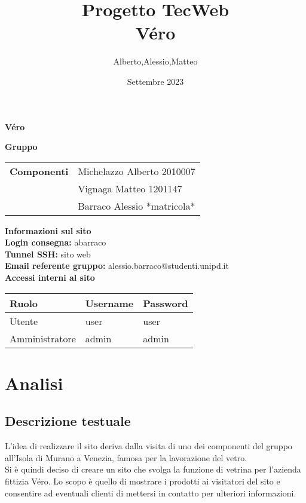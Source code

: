 \documentclass[a4paper, 11pt]{article}
\title{Progetto TecWeb \\ Véro}
\author{Alberto,Alessio,Matteo}
\date{Settembre 2023}
\begin{document}
\begin{center}
	\textbf{\Huge{Véro}}
\end{center}

\vspace{5pt}

\begin{center}
	\textbf{\Large{Gruppo}}
    \begin{table}[H]
        \hspace{3.5cm}
        \renewcommand{\arraystretch}{1.4}
        \begin{tabular}{l | l}
            \textbf{Componenti} & Michelazzo Alberto 2010007\\
            & Vignaga Matteo 1201147\\
            & Barraco Alessio *matricola*\\
        \end{tabular}
    \end{table}
\end{center}


\begin{center}
	\textbf{\Large{Informazioni sul sito}}\\
	\vspace{4pt}
	\textbf{Login consegna:} abarraco \\
	\textbf{Tunnel SSH:} sito web\\
	\textbf{Email referente gruppo:} alessio.barraco@studenti.unipd.it\\
    \vspace{1cm}
    \textbf{Accessi interni al sito}
    \begin{longtable}{|l|l|l|}
        \hline
        {Ruolo} & {Username} & {Password} \\ \hline
        Utente         & user     & user     \\ \hline
        Amministratore & admin    & admin \\ \hline
    \end{longtable}
\end{center}

\pagebreak
\tableofcontents
\pagebreak


\section{Analisi}
\subsection{Descrizione testuale}
L’idea di realizzare il sito deriva dalla visita di uno dei componenti del gruppo all’Isola di Murano a Venezia, famosa per la lavorazione del vetro. \\
Si è quindi deciso di creare un sito che svolga la funzione di vetrina per l’azienda fittizia Véro. Lo scopo è quello di mostrare i prodotti ai visitatori del sito e consentire ad eventuali clienti di mettersi in contatto per ulteriori informazioni. 
\end{document}
